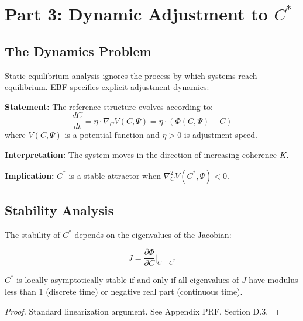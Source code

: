 \section{Part 3: Dynamic Adjustment to $C^*$}
\label{sec:az-dynamics}

\subsection{The Dynamics Problem}

Static equilibrium analysis ignores the process by which systems reach equilibrium.
EBF specifies explicit adjustment dynamics:

\begin{tcolorbox}[colback=gray!5!white, colframe=gray!75!black,
    title=Axiom AZ-D1: Gradient Adjustment Dynamics]
\textbf{Statement:} The reference structure evolves according to:
\begin{equation}
\frac{dC}{dt} = \eta \cdot \nabla_C V(C, \Psi) = \eta \cdot (\Phi(C, \Psi) - C)
\end{equation}
where $V(C, \Psi)$ is a potential function and $\eta > 0$ is adjustment speed.

\textbf{Interpretation:} The system moves in the direction of increasing coherence $K$.

\textbf{Implication:} $C^*$ is a stable attractor when $\nabla^2_C V(C^*, \Psi) < 0$.
\end{tcolorbox}

\subsection{Stability Analysis}

The stability of $C^*$ depends on the eigenvalues of the Jacobian:

\begin{equation}
J = \frac{\partial \Phi}{\partial C}\bigg|_{C=C^*}
\end{equation}

\begin{proposition}
$C^*$ is locally asymptotically stable if and only if all eigenvalues of $J$
have modulus less than 1 (discrete time) or negative real part (continuous time).
\end{proposition}

\begin{proof}
Standard linearization argument. See Appendix PRF, Section D.3.
\end{proof}

